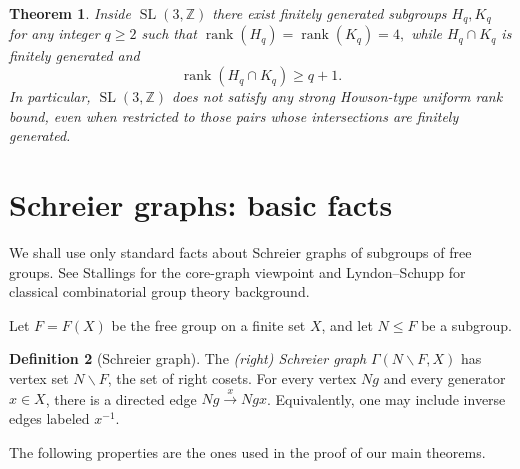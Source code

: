 \documentclass[]{amsart}
\newtheorem{thm}{Theorem}[section]
\newtheorem*{fixed point criterion}{\fixed point criterion}
\theoremstyle{definition}
\newtheorem{defn}[thm]{Definition}
\theoremstyle{remark}
\numberwithin{equation}{section}
\newcommand{\SL}{\operatorname{SL}}
\newcommand{\Z}{\mathbb Z}
\newcommand{\rank}{\operatorname{rank}}
\begin{document}
\begin{thm}\label{SL3n not satisfy strong Howson-type uniform rank}
Inside $\SL(3,\Z)$ there exist finitely generated subgroups $H_q,K_q$ for any integer $q\geq 2$ such
that
$\rank(H_q)=\rank(K_q)=4,$
while $H_q\cap K_q$ is finitely generated and
\[
\rank(H_q\cap K_q)\geq q+1.
\]
In particular, $\SL(3,\Z)$ does not satisfy any strong Howson-type uniform rank
bound, even when restricted to those pairs whose intersections are finitely
generated.
\end{thm}

\section{Schreier graphs: basic facts}

We shall use only standard facts about Schreier graphs of subgroups of free
groups.  See Stallings \cite{Stallings1983} for the core-graph viewpoint and
Lyndon--Schupp \cite[Chapter I]{LyndonSchupp1977} for classical combinatorial
group theory background.

Let $F=F(X)$ be the free group on a finite set $X$, and let $N\leq F$ be a
subgroup.

\begin{defn}[Schreier graph]
The \emph{(right) Schreier graph} $\Gamma(N\backslash F,X)$ has vertex set
$N\backslash F$, the set of right cosets.  For every vertex $Ng$ and every generator $x\in X$, there is
a directed edge
   $Ng \xrightarrow{x} Ngx$.
Equivalently, one may include inverse edges labeled $x^{-1}$.
\end{defn}

The following properties are the ones used in the proof of our main theorems.
\end{document}
